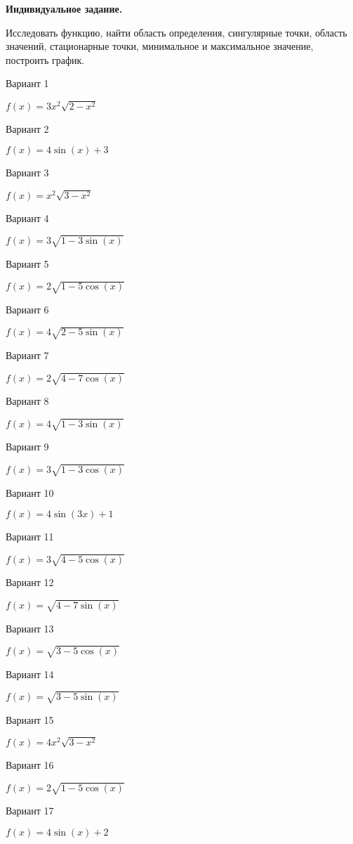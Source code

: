 \documentclass[11pt]{report}
\begin{document}
\pagestyle{empty}

{\bf Индивидуальное задание.}

 
Исследовать функцию, найти область определения, сингулярные точки, область значений, стационарные точки, 
минимальное и максимальное значение, построить график.

Вариант 1

$f(x) = 3 x^{2} \sqrt{2 - x^{2}}$

Вариант 2

$f(x) = 4 \sin{\left(x \right)} + 3$

Вариант 3

$f(x) = x^{2} \sqrt{3 - x^{2}}$

Вариант 4

$f(x) = 3 \sqrt{1 - 3 \sin{\left(x \right)}}$

Вариант 5

$f(x) = 2 \sqrt{1 - 5 \cos{\left(x \right)}}$

Вариант 6

$f(x) = 4 \sqrt{2 - 5 \sin{\left(x \right)}}$

Вариант 7

$f(x) = 2 \sqrt{4 - 7 \cos{\left(x \right)}}$

Вариант 8

$f(x) = 4 \sqrt{1 - 3 \sin{\left(x \right)}}$

Вариант 9

$f(x) = 3 \sqrt{1 - 3 \cos{\left(x \right)}}$

Вариант 10

$f(x) = 4 \sin{\left(3 x \right)} + 1$

Вариант 11

$f(x) = 3 \sqrt{4 - 5 \cos{\left(x \right)}}$

Вариант 12

$f(x) = \sqrt{4 - 7 \sin{\left(x \right)}}$

Вариант 13

$f(x) = \sqrt{3 - 5 \cos{\left(x \right)}}$

Вариант 14

$f(x) = \sqrt{3 - 5 \sin{\left(x \right)}}$

Вариант 15

$f(x) = 4 x^{2} \sqrt{3 - x^{2}}$

Вариант 16

$f(x) = 2 \sqrt{1 - 5 \cos{\left(x \right)}}$

Вариант 17

$f(x) = 4 \sin{\left(x \right)} + 2$
\end{document}
